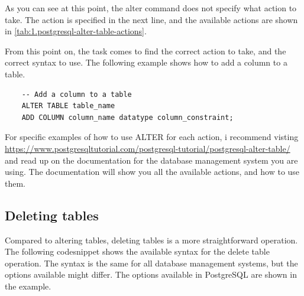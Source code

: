 As you can see at this point, the alter command does not specify what action to take. The action is specified in the next line, and the available actions are shown in \cref{tab:1.postgresql-alter-table-actions}.

\begin{table}[htb]
    \centering
    \caption{Available actions for the ALTER TABLE statement}
    \label{tab:1.postgresql-alter-table-actions}
\end{table}

From this point on, the task comes to find the correct action to take, and the correct syntax to use. The following example shows how to add a column to a table.

\begin{verbatim}
    -- Add a column to a table
    ALTER TABLE table_name 
    ADD COLUMN column_name datatype column_constraint;
\end{verbatim}

For specific examples of how to use ALTER for each action, i recommend visting \url{https://www.postgresqltutorial.com/postgresql-tutorial/postgresql-alter-table/} and read up on the documentation for the database management system you are using. The documentation will show you all the available actions, and how to use them.


\subsection{Deleting tables}
Compared to altering tables, deleting tables is a more straightforward operation. The following codesnippet shows the available syntax for the delete table operation. The syntax is the same for all database management systems, but the options available might differ. The options available in PostgreSQL are shown in the example.

